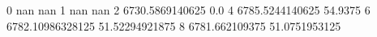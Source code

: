 0 nan nan
1 nan nan
2 6730.5869140625 0.0
4 6785.5244140625 54.9375
6 6782.10986328125 51.52294921875
8 6781.662109375 51.0751953125
